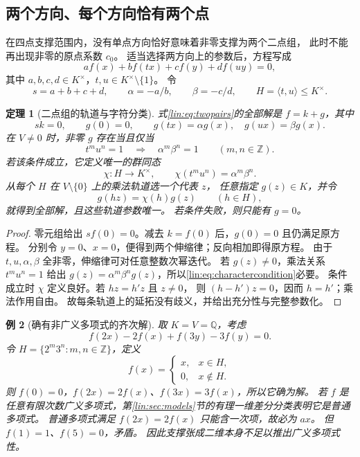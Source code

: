 \documentclass[11pt,a4paper,oneside,openany]{book}
\theoremstyle{lecture}
\newtheorem{theorem}{定理}[section]
\newtheorem{example}[theorem]{例}
\newcommand{\Q}{\mathbb Q}
\newcommand{\Z}{\mathbb Z}
\numberwithin{equation}{section}
\begin{document}
\subsection{两个方向、每个方向恰有两个点}
在四点支撑范围内，没有单点方向恰好意味着非零支撑为两个二点组，
此时不能再出现非零的原点系数 $c_0$。
适当选择两方向上的参数后，方程写成
\begin{equation}\label{lin:eq:twopairs}
 af(x)+bf(tx)+cf(y)+df(uy)=0,
\end{equation}
其中 $a,b,c,d\in K^\times$，$t,u\in K^\times\setminus\{1\}$。
令
\[
 s=a+b+c+d,\qquad \alpha=-a/b,\qquad\beta=-c/d,\qquad
 H=\langle t,u\rangle\le K^\times.
\]

\begin{theorem}[二点组的轨道与字符分类]\label{lin:thm:orbit}
式\eqref{lin:eq:twopairs}的全部解是 $f=k+g$，其中
\[
 sk=0,\qquad g(0)=0,\qquad
 g(tx)=\alpha g(x),\quad g(ux)=\beta g(x).
\]
在 $V\ne0$ 时，非零 $g$ 存在当且仅当
\begin{equation}\label{lin:eq:charactercondition}
 t^m u^n=1\quad\Longrightarrow\quad
 \alpha^m\beta^n=1
 \qquad(m,n\in\Z).
\end{equation}
若该条件成立，它定义唯一的群同态
\[
 \chi:H\to K^\times,\qquad
 \chi(t^mu^n)=\alpha^m\beta^n.
\]
从每个 $H$ 在 $V\setminus\{0\}$ 上的乘法轨道选一个代表 $z$，
任意指定 $g(z)\in K$，并令
\[
 g(hz)=\chi(h)g(z)\qquad(h\in H),
\]
就得到全部解，且这些轨道参数唯一。
若条件失败，则只能有 $g=0$。
\end{theorem}
\begin{proof}
零元组给出 $sf(0)=0$。减去 $k=f(0)$ 后，$g(0)=0$ 且仍满足原方程。
分别令 $y=0$、$x=0$，便得到两个伸缩律；反向相加即得原方程。
由于 $t,u,\alpha,\beta$ 全非零，伸缩律可对任意整数次幂迭代。
若 $g(z)\ne0$，乘法关系 $t^mu^n=1$ 给出
$g(z)=\alpha^m\beta^n g(z)$，所以\eqref{lin:eq:charactercondition}必要。
条件成立时 $\chi$ 定义良好。若 $hz=h'z$ 且 $z\ne0$，
则 $(h-h')z=0$，因而 $h=h'$；乘法作用自由。
故每条轨道上的延拓没有歧义，并给出充分性与完整参数化。
\end{proof}

\begin{example}[确有非广义多项式的齐次解]\label{lin:ex:nongeneral}
取 $K=V=\Q$，考虑
\[
 f(2x)-2f(x)+f(3y)-3f(y)=0.
\]
令 $H=\{2^m3^n:m,n\in\Z\}$，定义
\[
 f(x)=
 \begin{cases}
 x,&x\in H,\\
 0,&x\notin H.
 \end{cases}
\]
则 $f(0)=0$，$f(2x)=2f(x)$、$f(3x)=3f(x)$，所以它确为解。
若 $f$ 是任意有限次数广义多项式，第\ref{lin:sec:models}节的有理一维差分分类表明它是普通多项式。
普通多项式满足 $f(2x)=2f(x)$ 只能含一次项，故必为 $ax$。
但 $f(1)=1$、$f(5)=0$，矛盾。
因此支撑张成二维本身不足以推出广义多项式性。
\end{example}
\end{document}
